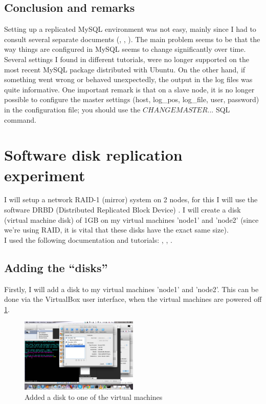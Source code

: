 \documentclass[12pt]{report}
\begin{document}
\subsection{Conclusion and remarks}
Setting up a replicated MySQL environment was not easy, mainly since I
had to consult several separate documents (\cite{mysql_official_replication_doc}, \cite{mysql_replication_howtoforge}, \cite{mysql_replication_stackexchange}). The main problem seems to
be that the way things are configured in MySQL seems to change significantly
over time. Several settings I found in different tutorials, were no
longer supported on the most recent MySQL package distributed with
Ubuntu.
On the other hand, if something went wrong or behaved unexpectedly,
the output in the log files was quite informative. 
One important remark is that on a slave node, it is no longer possible
to configure the master settings (host, log\_pos, log\_file, user,
password) in the configuration file; you should use the $CHANGE
MASTER ...$ SQL command.

\section{Software disk replication experiment}
I will setup a network RAID-1 (mirror)
system on 2 nodes, for this I will use the software DRBD 
(Distributed Replicated Block Device) \cite{drbd_soft:2013}.
I will create a disk (virtual machine disk) of 1GB on my virtual
machines 'node1' and 'node2' (since we're using RAID, it is vital that
these disks have the exact same size).\\

I used the following documentation and tutorials:
\cite{drbd_ubuntu_doc}, \cite{drbd_official_doc}, \cite{drbd_howtoforge}.

\subsection{Adding the ``disks''}
Firstly, I will add a disk to my virtual machines 'node1' and
'node2'. This can be done via the VirtualBox user interface, when the
virtual machines are powered off \ref{fig:add_disk_vbox}.

\begin{figure}[h!]
  \caption{Added a disk to one of the virtual machines}
  \label{fig:add_disk_vbox}
  \centering
    \includegraphics[width=0.5\textwidth]{pics/add_disk_vbox.png}
\end{figure}
\end{document}
